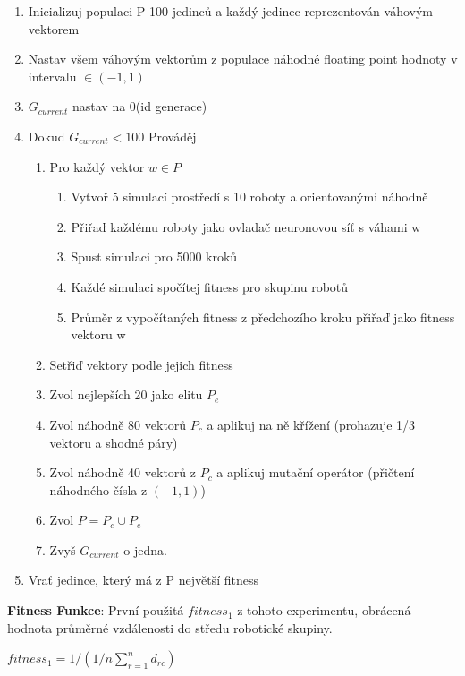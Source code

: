 \begin{enumerate}
    \item Inicializuj populaci P 100 jedinců a každý jedinec reprezentován váhovým vektorem
    \item Nastav všem váhovým vektorům z populace náhodné floating point hodnoty v intervalu $\in (-1,1)$ 
    \item $G_{current}$ nastav na 0(id generace)
    \item Dokud $G_{current} < 100$ Prováděj \begin{enumerate}
        \item Pro každý vektor $w \in P$ \begin{enumerate}
            \item Vytvoř 5 simulací prostředí s 10 roboty a orientovanými náhodně
            \item Přiřaď každému roboty jako ovladač neuronovou síť s váhami w
            \item Spust simulaci pro 5000 kroků
            \item Každé simulaci spočítej fitness pro skupinu robotů
            \item Průměr z vypočítaných fitness z předchozího kroku přiřaď jako fitness vektoru w
        \end{enumerate} 
    \item Setřiď vektory podle jejich fitness 
    \item Zvol nejlepších 20 jako elitu $P_{e}$
    \item Zvol náhodně 80 vektorů $P_c$ a aplikuj na ně křížení (prohazuje 1/3 vektoru a shodné páry)
    \item Zvol náhodně 40 vektorů z $P_c$ a aplikuj mutační operátor (přičtení náhodného čísla z $(-1,1)$)
    \item Zvol $P = P_c \cup P_e$
    \item Zvyš $G_{current}$  o jedna. 
    \end{enumerate} 
    \item Vrať jedince, který má z P největší fitness    
\end{enumerate} 
\par 
\textbf{Fitness Funkce}: První použitá $fitness_1$ z tohoto experimentu, obrácená hodnota průměrné vzdálenosti do středu robotické skupiny. 
\par
\begin{center}
\textbf{$fitness_1 = 1/(1/n\sum\limits_{r=1}^{n} d_{rc}) $}
\end{center}
\par 
